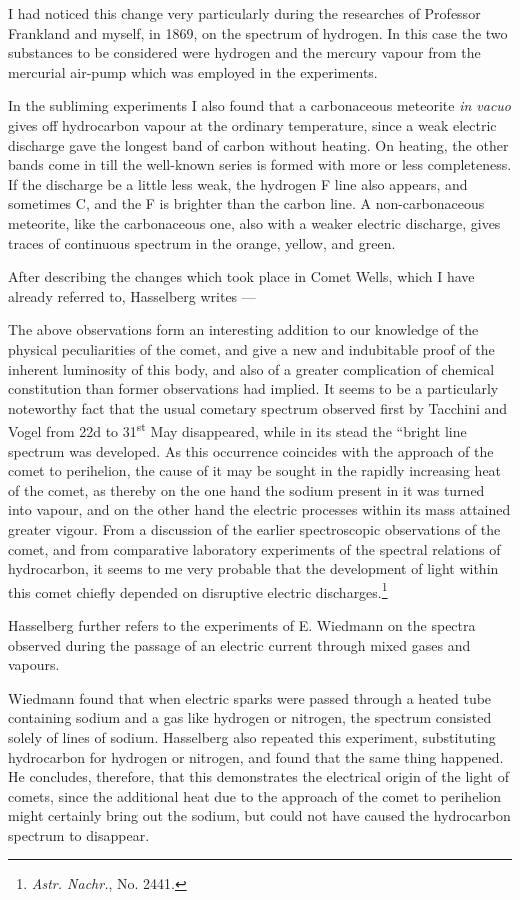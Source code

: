 \documentclass[a4paper, 12pt, oneside, polutonikogreek, english]{article}
\begin{document}
I had noticed this change very particularly during the researches of Professor Frankland and myself, in 1869, on the spectrum of hydrogen. In this case the two substances to be considered were hydrogen and the mercury vapour from the mercurial air-pump which was employed in the experiments.

In the subliming experiments I also found that a carbonaceous meteorite \emph{in vacuo} gives off hydrocarbon vapour at the ordinary temperature, since a weak electric discharge gave the longest band of carbon without heating. On heating, the other bands come in till the well-known series is formed with more or less completeness. If the discharge be a little less weak, the hydrogen F line also appears, and sometimes C, and the F is brighter than the carbon line. A non-carbonaceous meteorite, like the carbonaceous one, also with a weaker electric discharge, gives traces of continuous spectrum in the orange, yellow, and green.

After describing the changes which took place in Comet Wells, which I have already referred to, Hasselberg writes ---

The above observations form an interesting addition to our knowledge of the physical peculiarities of the comet, and give a new and indubitable proof of the inherent luminosity of this body, and also of a greater complication of chemical constitution than former observations had implied. It seems to be a particularly noteworthy fact that the usual cometary spectrum observed first by Tacchini and Vogel from 22d to 31\textsuperscript{st} May disappeared, while in its stead the ``bright line spectrum was developed. As this occurrence coincides with the approach of the comet to perihelion, the cause of it may be sought in the rapidly increasing heat of the comet, as thereby on the one hand the sodium present in it was turned into vapour, and on the other hand the electric processes within its mass attained greater vigour. From a discussion of the earlier spectroscopic observations of the comet, and from comparative laboratory experiments of the spectral relations of hydrocarbon, it seems to me very probable that the development of light within this comet chiefly depended on disruptive electric discharges.\footnote{\emph{Astr. Nachr.}, No. 2441.}

Hasselberg further refers to the experiments of E. Wiedmann on the spectra observed during the passage of an electric current through mixed gases and vapours.

Wiedmann found that when electric sparks were passed through a heated tube containing sodium and a gas like hydrogen or nitrogen, the spectrum consisted solely of lines of sodium. Hasselberg also repeated this experiment, substituting hydrocarbon for hydrogen or nitrogen, and found that the same thing happened. He concludes, therefore, that this demonstrates the electrical origin of the light of comets, since the additional heat due to the approach of the comet to perihelion might certainly bring out the sodium, but could not have caused the hydrocarbon spectrum to disappear.
\end{document}
